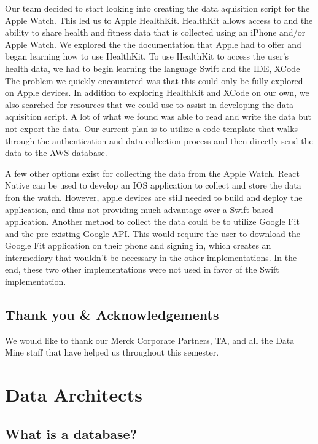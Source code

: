 \documentclass[]{book}
\begin{document}
Our team decided to start looking into creating the data aquisition script for the Apple Watch. This led us to Apple HealthKit. HealthKit allows access to and the ability to share health and fitness data that is collected using an iPhone and/or Apple Watch. We explored the the documentation that Apple had to offer and began learning how to use HealthKit. To use HealthKit to access the user's health data, we had to begin learning the language Swift and the IDE, XCode The problem we quickly encountered was that this could only be fully explored on Apple devices. In addition to exploring HealthKit and XCode on our own, we also searched for resources that we could use to assist in developing the data aquisition script. A lot of what we found was able to read and write the data but not export the data. Our current plan is to utilize a code template that walks through the authentication and data collection process and then directly send the data to the AWS database.

A few other options exist for collecting the data from the Apple Watch. React Native can be used to develop an IOS application to collect and store the data fron the watch. However, apple devices are still needed to build and deploy the application, and thus not providing much advantage over a Swift based application. Another method to collect the data could be to utilize Google Fit and the pre-existing Google API. This would require the user to download the Google Fit application on their phone and signing in, which creates an intermediary that wouldn't be necessary in the other implementations. In the end, these two other implementations were not used in favor of the Swift implementation.

\hypertarget{thank-you-acknowledgements}{%
\section{Thank you \& Acknowledgements}\label{thank-you-acknowledgements}}

We would like to thank our Merck Corporate Partners, TA, and all the Data Mine staff that have helped us throughout this semester.

\hypertarget{data-architects}{%
\chapter{Data Architects}\label{data-architects}}

\hypertarget{what-is-a-database}{%
\section{What is a database?}\label{what-is-a-database}}
\end{document}
